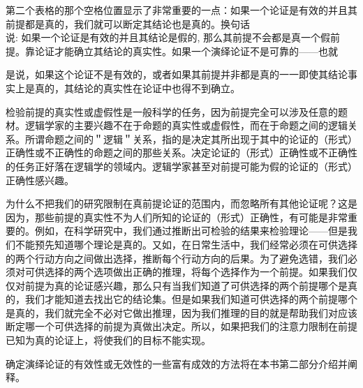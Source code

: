 第二个表格的那个空格位置显示了非常重要的一点：如果一个论证是有效的并且其前提都是真的，我们就可以断定其结论也是真的。换句话\\
说: 如果一个论证是有效的并且其结论是假的, 那么其前提不会都是真一个假前提。靠论证才能确立其结论的真实性。如果一个演绎论证不是可靠的——也就

是说，如果这个论证不是有效的，或者如果其前提并非都是真的一一即使其结论事实上是真的，其结论的真实性在论证中也得不到确立。

检验前提的真实性或虚假性是一般科学的任务，因为前提完全可以涉及任意的题材。逻辑学家的主要兴趣不在于命题的真实性或虚假性，而在于命题之间的逻辑关系。所谓命题之间的＂逻辑＂关系，指的是决定其所出现于其中的论证的（形式）正确性或不正确性的命题之间的那些关系。决定论证的（形式）正确性或不正确性的任务正好落在逻辑学的领域内。逻辑学家甚至对前提可能为假的论证的（形式）正确性感兴趣。

为什么不把我们的研究限制在真前提论证的范围内，而忽略所有其他论证呢？这是因为，那些前提的真实性不为人们所知的论证的（形式）正确性，有可能是非常重要的。例如，在科学研究中，我们通过推断出可检验的结果来检验理论——但是我们不能预先知道哪个理论是真的。又如，在日常生活中，我们经常必须在可供选择的两个行动方向之间做出选择，推断每个行动方向的后果。为了避免选错，我们必须对可供选择的两个选项做出正确的推理，将每个选择作为一个前提。如果我们仅仅对前提为真的论证感兴趣，那么只有当我们知道了可供选择的两个前提哪个是真的，我们才能知道去找出它的结论集。但是如果我们知道可供选择的两个前提哪个是真的，我们就完全不必对它做出推理，因为我们推理的目的就是帮助我们对应该断定哪一个可供选择的前提为真做出决定。所以，如果把我们的注意力限制在前提已知为真的论证上，将使我们的目标不能实现。

确定演绎论证的有效性或无效性的一些富有成效的方法将在本书第二部分介绍并阐释。 